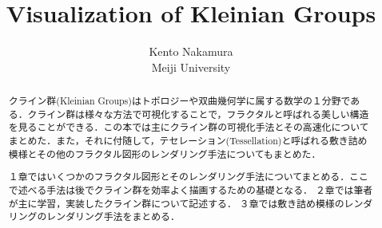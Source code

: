 \documentclass[dvipdfmx]{article}
\title{ Visualization of Kleinian Groups }
\author{ Kento Nakamura\\
Meiji University\\
}
\date{}
\begin{document}
\maketitle

\begin{abstract}
クライン群(Kleinian Groups)はトポロジーや双曲幾何学に属する数学の１分野である．クライン群は様々な方法で可視化することで，フラクタルと呼ばれる美しい構造を見ることができる．この本では主にクライン群の可視化手法とその高速化についてまとめた．また，それに付随して，テセレーション(Tessellation)と呼ばれる敷き詰め模様とその他のフラクタル図形のレンダリング手法についてもまとめた．

１章ではいくつかのフラクタル図形とそのレンダリング手法についてまとめる．ここで述べる手法は後でクライン群を効率よく描画するための基礎となる．
２章では筆者が主に学習，実装したクライン群について記述する．
３章では敷き詰め模様のレンダリングのレンダリング手法をまとめる．
\end{abstract}

\tableofcontents






\end{document}
